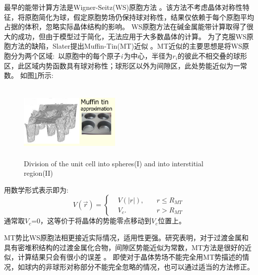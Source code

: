 {最早的能带计算方法是Wigner-Seitz(WS)原胞方法%
。该方法不考虑晶体对称性特征，将原胞简化为球，假定原胞势场仍保持球对称性，结果仅依赖于每个原胞平均占据的体积，忽略实际晶体结构的影响。%
\textrm{WS}原胞方法在碱金属能带计算取得了很大的成功，但由于模型过于简化，无法应用于大多数晶体的计算。%
为了克服WS原胞方法的缺陷，Slater提出Muffin-Tin(MT)近似%
。MT近似的主要思想是将WS原胞分为两个区域:~以原胞中的每个原子{\it i}\,为中心，半径为$r_i$的彼此不相交叠的球形区，此区域内势函数具有球对称性；球形区以外为间隙区，此处势能近似为一常数。
如图\ref{Muffin_tin-1}所示:
\begin{figure}[h!]
\centering
\includegraphics[height=1.45in,width=1.92in,viewport=1 22 317 295,clip]{Figures/Muffin-tin.png}
\caption{\small \textrm{Division of the unit cell into spheres(I) and into interstitial region(II)}}%
\label{Muffin_tin-1}
\end{figure} 

用数学形式表示即为:
\begin{equation}
  V(\vec r)=\left\{
  \begin{aligned}
    &V(|r|),\quad&r\leqslant R_{MT} \\
    &V_c.&r>R_{MT}
  \end{aligned}\right.
  \label{eq:Muffin-Tin}
\end{equation}
通常取$V_c$=0，这等价于将晶体的势能零点移动到$V_c$位置上。

MT势比WS原胞法相更接近实际情况，适用性更强。研究表明，对于过渡金属和具有密堆积结构的过渡金属化合物，间隙区势能近似为常数，MT方法是很好的近似，计算结果只会有很小的误差%
。%
即使对于晶体势场不能完全用MT势描述的情况，如球内的非球形对称部分不能完全忽略的情况，也可以通过适当的方法修正。

}
